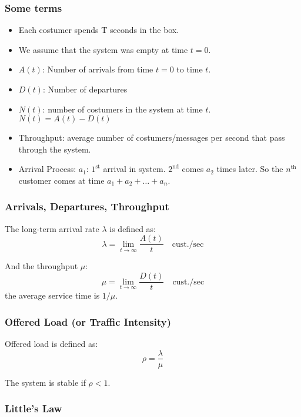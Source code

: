 \documentclass[10pt, a4paper, twocolumn]{scrartcl}
\begin{document}
\subsubsection{Some terms}
\begin{itemize}
	\item Each costumer spends T seconds in the box.
	\item We assume that the system was empty at time $t=0$.
	\item $A(t)$: Number of arrivals from time $t=0$ to time $t$.
	\item $D(t)$: Number of departures
	\item $N(t)$: number of costumers in the system at time $t$. $N(t) = A(t)-D(t)$
	\item Throughput: average number of costumers/messages per second that pass through the system.
	\item Arrival Process: $a_1$: $1^{\mbox{st}}$ arrival in system. $2^{\mbox{nd}}$ comes $a_2$ times later. So the $n^{\mbox{th}}$ customer comes at time $a_1+a_2+\ldots+a_n$.
\end{itemize}

\subsubsection{Arrivals, Departures, Throughput}

The long-term arrival rate $\lambda$ is defined as:
\begin{displaymath}
	\lambda = \lim_{t\to\infty} \frac{A(t)}{t} \quad \mbox{cust./sec}
\end{displaymath}

And the throughput $\mu$:
\begin{displaymath}
	\mu = \lim_{t\to\infty}\frac{D(t)}{t} \quad \mbox{cust./sec}
\end{displaymath}
the average service time is $1/\mu$.

\subsubsection{Offered Load (or Traffic Intensity)}

Offered load is defined as:
\begin{displaymath}
	\rho = \frac{\lambda}{\mu}
\end{displaymath}

The system is stable if $\rho < 1$.

\subsubsection{Little's Law}
\end{document}
